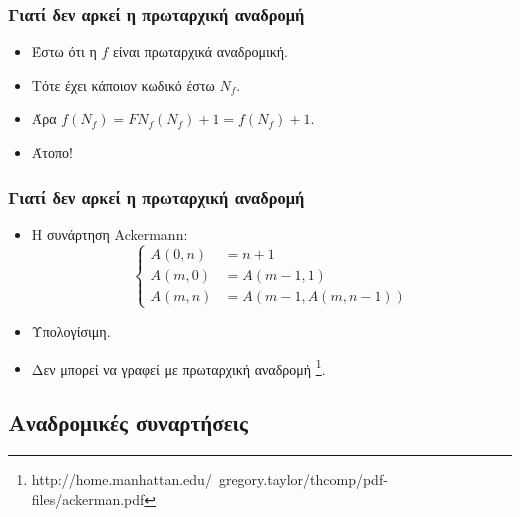 \documentclass{beamer}
\begin{document}
\begin{frame}
        \frametitle{Γιατί δεν αρκεί η πρωταρχική αναδρομή}
        \begin{itemize}
                \item Έστω ότι η \(f\) είναι πρωταρχικά αναδρομική.
                \pause
                \item Τότε έχει κάποιον κωδικό έστω \(N_f\).
                \pause
                \item Άρα \(f(N_f) = FN_f(N_f) + 1 = f(N_f) + 1\).
                \pause
                \item Άτοπο!
        \end{itemize}
\end{frame}

\begin{frame}
        \frametitle{Γιατί δεν αρκεί η πρωταρχική αναδρομή}
        \begin{itemize}
                \item Η συνάρτηση Ackermann:
                \[\left\{
                        \begin{array}{ll}
                                A(0,n) &= n+1\\
                                A(m,0) &= A(m-1,1)\\
                                A(m,n) &= A(m-1, A(m,n-1))
                        \end{array}
                \right.\]
                \pause
                \item Υπολογίσιμη.
                \pause
                \item Δεν μπορεί να γραφεί με πρωταρχική αναδρομή 
                \footnote{
                {http://home.manhattan.edu/~gregory.taylor/thcomp/pdf-files/ackerman.pdf}}.
        \end{itemize}
\end{frame}

\subsection{Αναδρομικές συναρτήσεις}
\end{document}
